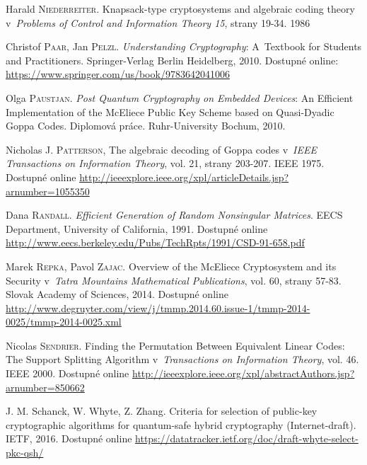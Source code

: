 \documentclass[thesis=M,czech,hidelinks]{FITthesis}[2012/06/26]
\newcommand{\0}{{\textcolor[gray]{0.75}{0}}}
\begin{document}
\begin{thebibliography}{99}
        Harald \textsc{Niederreiter}. Knapsack-type cryptosystems and
        algebraic coding theory v~\emph{Problems of Control and Information
        Theory 15}, strany 19-34. 1986

        Christof \textsc{Paar}, Jan \textsc{Pelzl}. \emph{Understanding
        Cryptography}: A~Textbook for Students and Practitioners.
        Springer-Verlag Berlin Heidelberg, 2010. Dostupné
        online: \url{https://www.springer.com/us/book/9783642041006}

        Olga \textsc{Paustjan}. \emph{Post Quantum Cryptography on Embedded
        Devices}: An Efficient Implementation of the McEliece Public Key Scheme
        based on Quasi-Dyadic Goppa Codes. Diplomová práce. Ruhr-University
        Bochum, 2010.


        Nicholas J. \textsc{Patterson}, The algebraic decoding of Goppa codes
        v~\emph{IEEE Transactions on Information Theory}, vol. 21, strany
        203-207. IEEE 1975. Dostupné online
        \url{http://ieeexplore.ieee.org/xpl/articleDetails.jsp?arnumber=1055350}

        Dana \textsc{Randall}. \emph{Efficient Generation of Random Nonsingular
        Matrices}. EECS Department, University of California, 1991. Dostupné
        online
        \url{http://www.eecs.berkeley.edu/Pubs/TechRpts/1991/CSD-91-658.pdf}

        Marek \textsc{Repka}, Pavol \textsc{Zajac}. Overview of the McEliece
        Cryptosystem and its Security v~\emph{Tatra Mountains Mathematical
        Publications}, vol. 60, strany 57-83. Slovak Academy of Sciences, 2014.
        Dostupné online
        \url{http://www.degruyter.com/view/j/tmmp.2014.60.issue-1/tmmp-2014-0025/tmmp-2014-0025.xml}

        Nicolas \textsc{Sendrier}. Finding the Permutation Between Equivalent
        Linear Codes: The Support Splitting Algorithm v~\emph{Transactions on
        Information Theory}, vol. 46. IEEE 2000. Dostupné online
        \url{http://ieeexplore.ieee.org/xpl/abstractAuthors.jsp?arnumber=850662}

        J. M. Schanck, W. Whyte, Z. Zhang. Criteria for selection of public-key
        cryptographic algorithms for quantum-safe hybrid cryptography
        (Internet-draft). IETF, 2016. Dostupné online
        \url{https://datatracker.ietf.org/doc/draft-whyte-select-pkc-qsh/}


\end{thebibliography}
\end{document}

